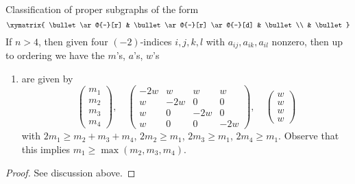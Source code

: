 \begin{lemma}
\label{lemma-D4}
Classification of proper subgraphs of the form
$$
\xymatrix{
\bullet \ar@{-}[r] & \bullet \ar@{-}[r] \ar@{-}[d] & \bullet \\
& \bullet
}
$$
If $n > 4$, then given four $(-2)$-indices $i, j, k, l$
with $a_{ij}, a_{ik}, a_{il}$ nonzero, then up
to ordering we have the $m$'s, $a$'s, $w$'s
\begin{enumerate}
\item
\label{item-D4}
are given by
$$
\left(
\begin{matrix}
m_1 \\
m_2 \\
m_3 \\
m_4
\end{matrix}
\right),
\quad
\left(
\begin{matrix}
-2w & w & w & w \\
w & -2w & 0 & 0 \\
w & 0 & -2w & 0 \\
w & 0 & 0 & -2w 
\end{matrix}
\right),
\quad
\left(
\begin{matrix}
w \\
w \\
w \\
w
\end{matrix}
\right)
$$
with $2m_1 \geq m_2 + m_3 + m_4$, $2m_2 \geq m_1$, $2m_3 \geq m_1$,
$2m_4 \geq m_1$. Observe that this implies $m_1 \geq \max(m_2, m_3, m_4)$.
\end{enumerate}
\end{lemma}

\begin{proof}
See discussion above.
\end{proof}

